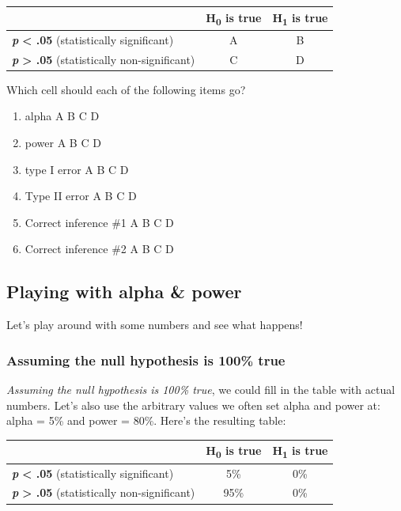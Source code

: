 \documentclass[
]{book}
\providecommand{\tightlist}{%
  \setlength{\itemsep}{0pt}\setlength{\parskip}{0pt}}
\begin{document}
\begin{longtable}[]{@{}lcc@{}}
\toprule
& H\textsubscript{0} is true & H\textsubscript{1} is true\tabularnewline
\midrule
\endhead
\textbf{\emph{p}} \textbf{\textless{} .05} (statistically significant) & A & B\tabularnewline
\textbf{\emph{p}} \textbf{\textgreater{} .05} (statistically non-significant) & C & D\tabularnewline
\bottomrule
\end{longtable}

Which cell should each of the following items go?

\begin{enumerate}
\def\labelenumi{\arabic{enumi}.}
\tightlist
\item
  alpha A B C D
\item
  power A B C D
\item
  type I error A B C D
\item
  Type II error A B C D
\item
  Correct inference \#1 A B C D
\item
  Correct inference \#2 A B C D
\end{enumerate}

\hypertarget{playing-with-alpha-power}{%
\subsection{Playing with alpha \& power}\label{playing-with-alpha-power}}

Let's play around with some numbers and see what happens!

\hypertarget{assuming-the-null-hypothesis-is-100-true}{%
\subsubsection{Assuming the null hypothesis is 100\% true}\label{assuming-the-null-hypothesis-is-100-true}}

\emph{Assuming the null hypothesis is 100\% true}, we could fill in the table with actual numbers. Let's also use the arbitrary values we often set alpha and power at: alpha = 5\% and power = 80\%. Here's the resulting table:

\begin{longtable}[]{@{}lcc@{}}
\toprule
& H\textsubscript{0} is true & H\textsubscript{1} is true\tabularnewline
\midrule
\endhead
\textbf{\emph{p}} \textbf{\textless{} .05} (statistically significant) & 5\% & 0\%\tabularnewline
\textbf{\emph{p}} \textbf{\textgreater{} .05} (statistically non-significant) & 95\% & 0\%\tabularnewline
\bottomrule
\end{longtable}
\end{document}
